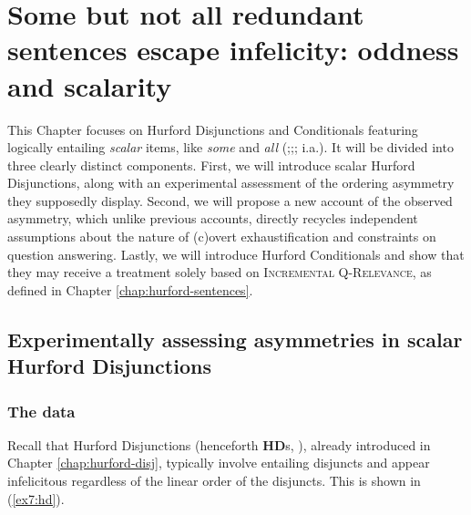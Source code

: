 \chapter[Some but not all redundant sentences escape infelicity: oddness and scalarity]{Some but not all redundant sentences escape infelicity: oddness and scalarity\footnotemark}\label{chap:scalarity}


This Chapter focuses on Hurford Disjunctions and Conditionals featuring logically entailing \textit{scalar} items, like \textit{some} and \textit{all} (;;; i.a.). It will be divided into three clearly distinct components. First, we will introduce scalar Hurford Disjunctions, along with an experimental assessment of the ordering asymmetry they supposedly display. Second, we will propose a new account of the observed asymmetry, which unlike previous accounts, directly recycles independent assumptions about the nature of (c)overt exhaustification and constraints on question answering. Lastly, we will introduce Hurford Conditionals and show that they may receive a treatment solely based on \textsc{Incremental Q-Relevance}, as defined in Chapter \ref{chap:hurford-sentences}.

\section{Experimentally assessing asymmetries in scalar Hurford Disjunctions}\label{sec7:asym-exp}

\subsection{The data}
Recall that Hurford Disjunctions (henceforth \textbf{HD}s, \cite{Hurford1974}), already introduced in Chapter \ref{chap:hurford-disj}, typically involve entailing disjuncts and appear infelicitous regardless of the linear order of the disjuncts. This is shown in (\ref{ex7:hd}).


